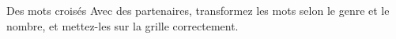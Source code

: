 \begin{frame}{Des mots croisés}
  Avec des partenaires, transformez les mots selon le genre et le nombre, et mettez-les sur la grille correctement.
  \begin{center}
  \end{center}
\end{frame}